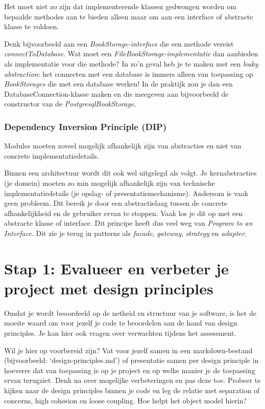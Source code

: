 \documentclass[dutch,a4paper,12pt,doubleside]{book}
\begin{document}
Het moet niet zo zijn dat implementerende klassen 
gedwongen worden om bepaalde methodes aan te bieden 
alleen maar om aan een interface of abstracte klasse te
voldoen. 

Denk bijvoorbeeld aan een \textit{BookStorage-interface}
die een methode vereist \textit{connectToDatabase}. Wat moet een
\textit{FileBookStorage-implementatie} dan aanbieden als implementatie
voor die methode? 
In zo'n geval heb je te maken met een \textit{leaky abstraction}:
het connecten met een database is immers alleen van 
toepassing op \textit{BookStorages} die met een database werken!
In de praktijk zou je dan een DatabaseConnection-klasse maken en die 
meegeven aan bijvoorbeeld de constructor van de \textit{PostgresqlBookStorage}.

\subsubsection{Dependency Inversion Principle (DIP)}
Modules moeten zoveel mogelijk afhankelijk zijn van abstracties
en niet van concrete implementatiedetails. 

Binnen een architectuur 
wordt dit ook wel uitgelegd als volgt. Je kernabstracties (je domein) moeten
zo min mogelijk afhankelijk zijn van technische implementatiedetails 
(je opslag- of presentatiemechanisme). Andersom is vaak geen probleem.
Dit bereik je door een abstractielaag tussen de concrete afhankelijkheid 
en de gebruiker ervan te stoppen. Vaak los je dit op met een abstracte klasse of interface.
Dit principe heeft dus veel weg van \textit{Program to an Interface}.
Dit zie je terug in patterns als 
\textit{facade}, \textit{gateway}, \textit{strategy} en \textit{adapter}.

\section{Stap 1: Evalueer en verbeter je project met design principles}
Omdat je wordt beoordeeld op de netheid en structuur van je software,
is het de moeite waard om voor jezelf je code te beoordelen aan de hand 
van design principles. Je kan hier ook vragen over verwachten tijdens 
het assessment.

Wil je hier op voorbereid zijn?
Vat voor jezelf samen in een markdown-bestand (bijvoorbeeld: `design-principles.md') 
of presentatie samen per design principle in hoeverre dat van toepassing is op je project en op 
welke manier je de toepassing ervan terugziet. 
Denk na over mogelijke verbeteringen en pas deze toe.
Probeer te kijken naar de design principles binnen je code
en leg de relatie met separation of concerns, high cohesion en loose coupling.
Hoe helpt het object model hierin? 
\end{document}
